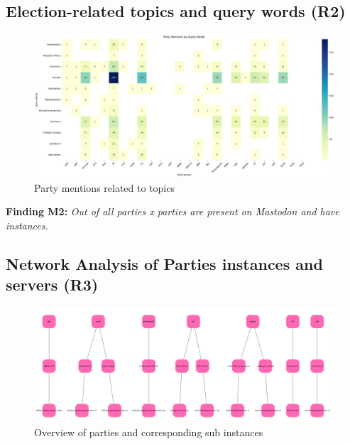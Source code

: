 \subsection{Election-related topics and query words (R2)}

\begin{figure}[H]
  \centering
  \includegraphics[width=\linewidth]{media/party-mentions-topics.jpeg}
  \caption{Party mentions related to topics}
  \label{fig:electionstotal}
\end{figure}


\textbf{Finding M2:} \textit{Out of all parties x parties are present on Mastodon and have instances.}

\subsection{Network Analysis of Parties instances and servers (R3)}


\begin{figure}[!]
  \centering
  \includegraphics[width=\linewidth]{media/party-network.png}
  \caption{Overview of parties and corresponding sub instances}
  \label{fig:partynetwork}
\end{figure}


